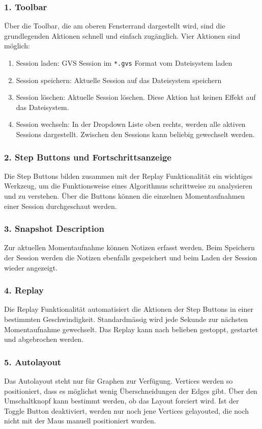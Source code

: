 \documentclass[11pt,a4paper,english,oneside]{book}
\numberwithin{equation}{chapter}
\begin{document}
	\subsubsection{1. Toolbar}
	Über die Toolbar, die am oberen Fensterrand dargestellt wird, sind die grundlegenden Aktionen schnell und einfach zugänglich. Vier Aktionen sind möglich: 
	\begin{enumerate}
		\item Session laden: GVS Session im \lstinline|*.gvs| Format vom Dateisystem laden
		\item Session speichern: Aktuelle Session auf das Dateisystem speichern
		\item Session löschen: Aktuelle Session löschen. Diese Aktion hat keinen Effekt auf das Dateisystem.
		\item Session wechseln: In der Dropdown Liste oben rechts, werden alle aktiven Sessions dargestellt. Zwischen den Sessions kann beliebig gewechselt werden. 
	\end{enumerate}
	
	\subsubsection{2. Step Buttons und Fortschrittsanzeige}
	Die Step Buttons bilden zusammen mit der Replay Funktionalität ein wichtiges Werkzeug, um die Funktionsweise eines Algorithmus schrittweise zu analysieren und zu verstehen. Über die Buttons können die einzelnen Momentaufnahmen einer Session durchgeschaut werden.
	
	\subsubsection{3. Snapshot Description}
	Zur aktuellen Momentaufnahme können Notizen erfasst werden. Beim Speichern der Session werden die Notizen ebenfalls gespeichert und beim Laden der Session wieder angezeigt.
	
	\subsubsection{4. Replay}
	Die Replay Funktionalität automatisiert die Aktionen der Step Buttons in einer bestimmten Geschwindigkeit. Standardmässig wird jede Sekunde zur nächsten Momentaufnahme gewechselt. Das Replay kann nach belieben gestoppt, gestartet und abgebrochen werden.
	
	\subsubsection{5. Autolayout}
	Das Autolayout steht nur für Graphen zur Verfügung. Vertices werden so positioniert, dass es möglichst wenig Überschneidungen der Edges gibt. Über den Umschaltknopf kann bestimmt werden, ob das Layout forciert wird. Ist der Toggle Button deaktiviert, werden nur noch jene Vertices gelayouted, die noch nicht mit der Maus manuell positioniert wurden.
	
\end{document}

